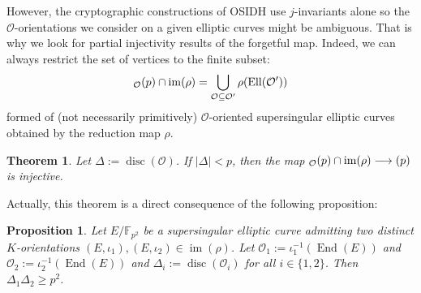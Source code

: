 \documentclass[a4paper,10pt]{report}
\theoremstyle{definition}
\theoremstyle{plain}
\newtheorem{Proposition}[Definition]{Proposition}
\newtheorem{Theorem}[Definition]{Theorem}
\theoremstyle{definition}
\newcommand{\N}{\mathbb{N}}
\newcommand{\Z}{\mathbb{Z}}
\newcommand{\F}{\mathbb{F}}
\newcommand{\mO}{\mathcal{O}}
\DeclareMathOperator{\im}{im}
\renewcommand{\(}{\left(}
\renewcommand{\)}{\right)}
\DeclareMathOperator{\End}{End}
\DeclareMathOperator{\disc}{disc}
\let\SS\relax
\DeclareMathOperator{\SS}{SS}
\DeclareMathOperator{\Ell}{Ell}
\begin{document}
However, the cryptographic constructions of OSIDH use $j$-invariants alone so the $\mO$-orientations we consider on a given elliptic curves might be ambiguous.  That is why we look for partial injectivity results of the forgetful map.  Indeed, we can always restrict the set of vertices to the finite subset:
\[\SS_{\mO}(p)\cap\im(\rho)=\bigcup_{\mO\subseteq\mO'}\rho(\Ell(\mO'))\]
formed of (not necessarily primitively) $\mO$-oriented supersingular elliptic curves obtained by the reduction map $\rho$.




\begin{Theorem}\label{Theorem 4}
Let $\Delta:=\disc(\mO)$. If $|\Delta|<p$, then the map $\SS_{\mO}(p)\cap\im(\rho)\longrightarrow\SS(p)$ is injective.
\end{Theorem}

Actually, this theorem is a direct consequence of the following proposition:

\begin{Proposition}\label{Proposition 7}
Let $E/\F_{p^2}$ be a supersingular elliptic curve admitting two distinct $K$-orientations $(E,\iota_1),(E,\iota_2)\in\im(\rho)$.  Let $\mO_1:=\iota_1^{-1}(\End(E))$ and $\mO_2:=\iota_2^{-1}(\End(E))$ and $\Delta_i:=\disc(\mO_i)$ for all $i\in\{1,2\}$.  Then $\Delta_1\Delta_2\geq p^2$.
\end{Proposition}
\end{document}
